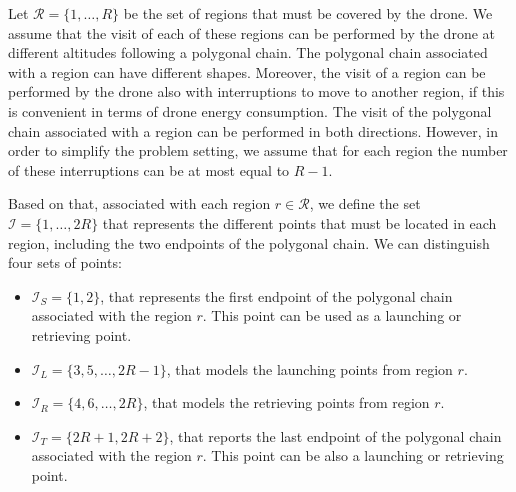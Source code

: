 \documentclass[12pt]{elsarticle}
\newcommand{\CV}[1]{{\color{blue}#1}}
\begin{document}
Let $\mathcal R = \{1, \ldots, R\}$ be the set of regions that must be covered by the drone. We assume that the visit of each of these regions can be performed by the drone at different altitudes following a polygonal chain. The polygonal chain associated with a region can have different shapes. Moreover, the visit of a region can be performed by the drone also with interruptions to move to another region, if this is convenient in terms of drone energy consumption. \CV{The visit of the polygonal chain associated with a region can be performed in both directions}. However, in order to simplify the problem setting, we assume that for each region the number of these interruptions can be at most equal to \CV{$R-1$}. \CV{
Based on that, associated with each region $r\in\mathcal R$, we define the set $\mathcal I=\{1, \ldots,2R\}$ that represents the different points that must be located in each region, including the two endpoints of the polygonal chain. We can distinguish four sets of points:
   \begin{itemize}
        \item $\mathcal I_S=\{1, 2\}$, that represents the first endpoint of the polygonal chain associated with the region $r$. This point can be used as a launching or retrieving point.
        \item $\mathcal I_L=\{3, 5,\ldots,2R-1\}$, that models the launching points from region $r$.
        \item $\mathcal I_R=\{4, 6,\ldots, 2R\}$, that models the retrieving points from region $r$.
        \item $\mathcal I_T=\{2R+1, 2R+2\}$, that reports the last endpoint of the polygonal chain associated with the region $r$. This point can be also a launching or retrieving point.
    \end{itemize}}
\end{document}
